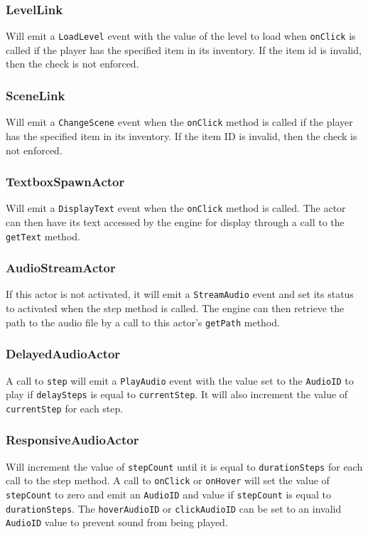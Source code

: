 \documentclass{article}
\begin{document}
    \subsubsection{LevelLink}
    Will emit a \texttt{LoadLevel} event with the value of the level to load when \texttt{onClick} is called if the player has the specified item in its inventory. If the item id is invalid, then the check is not enforced.
    \subsubsection{SceneLink}
    Will emit a \texttt{ChangeScene} event when the \texttt{onClick} method is called if the player has the specified item in its inventory. If the item ID is invalid, then the check is not enforced.
    \subsubsection{TextboxSpawnActor}
    Will emit a \texttt{DisplayText} event when the \texttt{onClick} method is called. The actor can then have its text accessed by the engine for display through a call to the \texttt{getText} method.
    \subsubsection{AudioStreamActor}
    If this actor is not activated, it will emit a \texttt{StreamAudio} event and set its status to activated when the step method is called. The engine can then retrieve the path to the audio file by a call to this actor's \texttt{getPath} method.
    \subsubsection{DelayedAudioActor}
    A call to \texttt{step} will emit a \texttt{PlayAudio} event with the value set to the \texttt{AudioID} to play if \texttt{delaySteps} is equal to \texttt{currentStep}. It will also increment the value of \texttt{currentStep} for each step.
    \subsubsection{ResponsiveAudioActor}
    Will increment the value of \texttt{stepCount} until it is equal to \texttt{durationSteps} for each call to the step method. A call to \texttt{onClick} or \texttt{onHover} will set the value of \texttt{stepCount} to zero and emit an \texttt{AudioID} and value if \texttt{stepCount} is equal to \texttt{durationSteps}. The \texttt{hoverAudioID} or \texttt{clickAudioID} can be set to an invalid \texttt{AudioID} value to prevent sound from being played.
\end{document}

